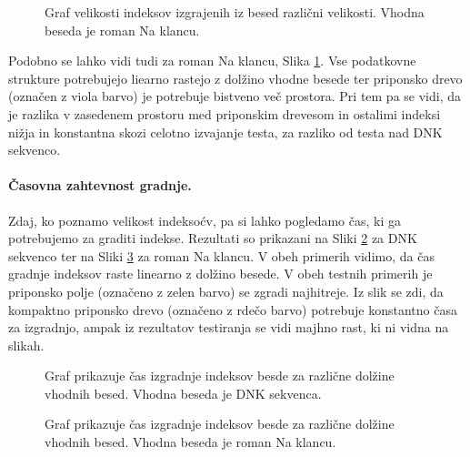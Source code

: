 \begin{figure}[tb]
    \centering
    
    \caption{Graf velikosti indeksov izgrajenih iz besed različni velikosti. Vhodna beseda je roman Na klancu.} 
    \label{fig:VelikostGrafSLO}
\end{figure}

Podobno se lahko vidi tudi za roman Na klancu, Slika \ref{fig:VelikostGrafSLO}. Vse podatkovne strukture potrebujejo liearno rastejo z dolžino vhodne besede ter priponsko drevo (označen z viola barvo) je potrebuje bistveno več prostora. Pri tem pa se vidi, da je razlika v zasedenem prostoru med priponskim drevesom in ostalimi indeksi nižja in konstantna skozi celotno izvajanje testa, za razliko od testa nad DNK sekvenco.



\paragraph{Časovna zahtevnost gradnje.} 

Zdaj, ko poznamo velikost indeksoćv, pa si lahko pogledamo čas, ki ga potrebujemo za graditi indekse. Rezultati so prikazani na Sliki \ref{fig:IzgradnjaGraf} za DNK sekvenco ter na Sliki \ref{fig:IzgradnjaGrafSLO} za roman Na klancu. V obeh primerih vidimo, da čas gradnje indeksov raste linearno z dolžino besede. V obeh testnih primerih je priponsko polje (označeno z zelen barvo) se zgradi najhitreje. Iz slik se zdi, da kompaktno priponsko drevo (označeno z rdečo barvo) potrebuje konstantno časa za izgradnjo, ampak iz rezultatov testiranja se vidi majhno rast, ki ni vidna na slikah.

\begin{figure}[htb]
    \centering
    
    \caption{Graf prikazuje čas izgradnje indeksov besde za različne dolžine vhodnih besed. Vhodna beseda je DNK sekvenca.} 
    \label{fig:IzgradnjaGraf}
\end{figure}

\begin{figure}[htb]
    \centering
    
    \caption{Graf prikazuje čas izgradnje indeksov besde za različne dolžine vhodnih besed. Vhodna beseda je roman Na klancu.} 
    \label{fig:IzgradnjaGrafSLO}
\end{figure}

